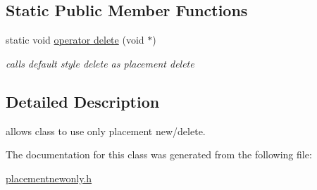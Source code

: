 \subsection*{Static Public Member Functions}
\begin{DoxyCompactItemize}
\item 
\hypertarget{classhryky_1_1_placementnewonly_a0f2889730fe6118b9da9cbc4189ac8d8}{static void \hyperlink{classhryky_1_1_placementnewonly_a0f2889730fe6118b9da9cbc4189ac8d8}{operator delete} (void $\ast$)}\label{classhryky_1_1_placementnewonly_a0f2889730fe6118b9da9cbc4189ac8d8}

\begin{DoxyCompactList}\small\item\em calls default style delete as placement delete \end{DoxyCompactList}\end{DoxyCompactItemize}


\subsection{Detailed Description}
allows class to use only placement new/delete. 

The documentation for this class was generated from the following file\-:\begin{DoxyCompactItemize}
\item 
\hyperlink{placementnewonly_8h}{placementnewonly.\-h}\end{DoxyCompactItemize}
